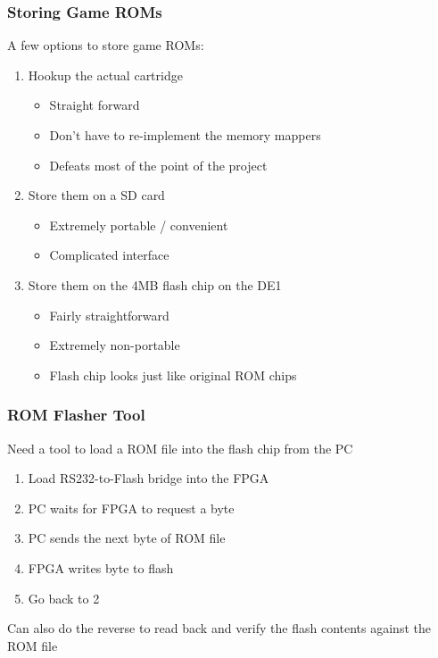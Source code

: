\documentclass{beamer}
\newlength{\wideitemsep}
\let\olditem\item
\renewcommand{\item}{\setlength{\itemsep}{\wideitemsep}\olditem}
\begin{document}
\begin{frame}
    \frametitle{Storing Game ROMs}

    A few options to store game ROMs:
    \begin{enumerate}
        \olditem<1->Hookup the actual cartridge
        \begin{itemize}
            \olditem<4->Straight forward
            \olditem<5->Don't have to re-implement the memory mappers
            \olditem<6->Defeats most of the point of the project
        \end{itemize}
        \olditem<2->Store them on a SD card
        \begin{itemize}
            \olditem<8->Extremely portable / convenient
            \olditem<9->Complicated interface
        \end{itemize}
        \olditem<3->Store them on the 4MB flash chip on the DE1
        \begin{itemize}
            \olditem<11->Fairly straightforward
            \olditem<12->Extremely non-portable
            \olditem<13->Flash chip looks just like original ROM chips
        \end{itemize}
    \end{enumerate}
\end{frame}

\begin{frame}
    \frametitle{ROM Flasher Tool}

    Need a tool to load a ROM file into the flash chip from the PC
    \vspace{0.25cm}
    \begin{enumerate}
        \item<2->Load RS232-to-Flash bridge into the FPGA
        \item<3->PC waits for FPGA to request a byte
        \item<4->PC sends the next byte of ROM file
        \item<5->FPGA writes byte to flash
        \item<6->Go back to 2
    \end{enumerate}
    \vspace{0.5cm}
     {Can also do the reverse to read back and verify the flash contents against the ROM file}
\end{frame}
\end{document}
